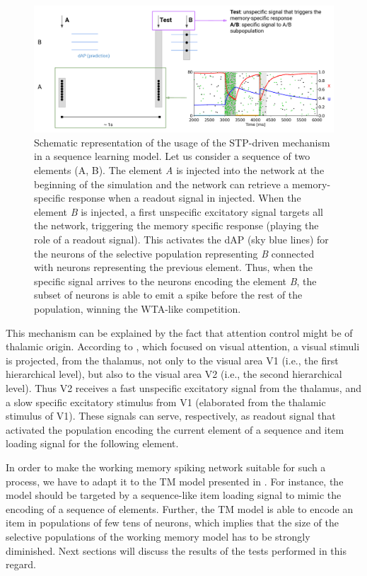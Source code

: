 \documentclass[a4paper, 12pt, twoside, openright]{book}
\begin{document}
\begin{figure}[h]
    \centering
    \includegraphics[width=\columnwidth]{figures/TM-STP.png}
    \caption{Schematic representation of the usage of the STP-driven mechanism in a sequence learning model. Let us consider a sequence of two elements (A, B). The element \textit{A} is injected into the network at the beginning of the simulation and the network can retrieve a memory-specific response when a readout signal in injected. When the element \textit{B} is injected, a first unspecific excitatory signal targets all the network, triggering the memory specific response (playing the role of a readout signal). This activates the dAP (sky blue lines) for the neurons of the selective population representing \textit{B} connected with neurons representing the previous element. Thus, when the specific signal arrives to the neurons encoding the element \textit{B}, the subset of neurons is able to emit a spike before the rest of the population, winning the WTA-like competition.}
    \label{fig:TM_STP}
\end{figure}

This mechanism can be explained by the fact that attention control might be of thalamic origin. According to \cite{Noudoost2010}, which focused on visual attention, a visual stimuli is projected, from the thalamus, not only to the visual area V1 (i.e., the first hierarchical level), but also to the visual area V2 (i.e., the second hierarchical level). Thus V2 receives a fast unspecific excitatory signal from the thalamus, and a slow specific excitatory stimulus from V1 (elaborated from the thalamic stimulus of V1). These signals can serve, respectively, as readout signal that activated the population encoding the current element of a sequence and item loading signal for the following element.


In order to make the working memory spiking network suitable for such a process, we have to adapt it to the TM model presented in \cite{Bouhadjar2022}. For instance, the model should be targeted by a sequence-like item loading signal to mimic the encoding of a sequence of elements. Further, the TM model is able to encode an item in populations of few tens of neurons, which implies that the size of the selective populations of the working memory model has to be strongly diminished. Next sections will discuss the results of the tests performed in this regard.
\end{document}
